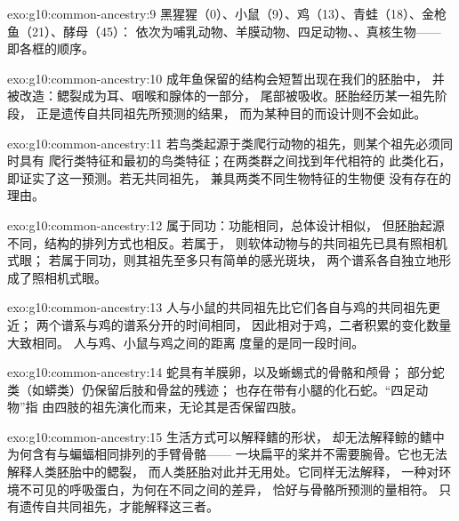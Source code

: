 \begin{solution}{exo:g10:common-ancestry:9}
黑猩猩（0）、小鼠（9）、鸡（13）、青蛙（18）、金枪鱼（21）、酵母（45）：
依次为哺乳动物、羊膜动物、四足动物、、真核生物——
即各框的顺序。
\end{solution}

\begin{solution}{exo:g10:common-ancestry:10}
成年鱼保留的结构会短暂出现在我们的胚胎中，
并被改造：鳃裂成为耳、咽喉和腺体的一部分，
尾部被吸收。胚胎经历某一祖先阶段，
正是遗传自共同祖先所预测的结果，
而为某种目的而设计则不会如此。
\end{solution}

\begin{solution}{exo:g10:common-ancestry:11}
若鸟类起源于类爬行动物的祖先，则某个祖先必须同时具有
爬行类特征和最初的鸟类特征；在两类群之间找到年代相符的
此类化石，即证实了这一预测。若无共同祖先，
兼具两类不同生物特征的生物便
没有存在的理由。
\end{solution}

\begin{solution}{exo:g10:common-ancestry:12}
属于同功：功能相同，总体设计相似，
但胚胎起源不同，结构的排列方式也相反。若属于，
则软体动物与的共同祖先已具有照相机式眼；
若属于同功，则其祖先至多只有简单的感光斑块，
两个谱系各自独立地形成了照相机式眼。
\end{solution}

\begin{solution}{exo:g10:common-ancestry:13}
人与小鼠的共同祖先比它们各自与鸡的共同祖先更近；
两个谱系与鸡的谱系分开的时间相同，
因此相对于鸡，二者积累的变化数量大致相同。
人与鸡、小鼠与鸡之间的距离
度量的是同一段时间。
\end{solution}

\begin{solution}{exo:g10:common-ancestry:14}
蛇具有羊膜卵，以及蜥蜴式的骨骼和颅骨；
部分蛇类（如蟒类）仍保留后肢和骨盆的残迹；
也存在带有小腿的化石蛇。“四足动物”指
由四肢的祖先演化而来，无论其是否保留四肢。
\end{solution}

\begin{solution}{exo:g10:common-ancestry:15}
生活方式可以解释鳍的形状，
却无法解释鲸的鳍中为何含有与蝙蝠相同排列的手臂骨骼——
一块扁平的桨并不需要腕骨。它也无法解释人类胚胎中的鳃裂，
而人类胚胎对此并无用处。它同样无法解释，
一种对环境不可见的呼吸蛋白，为何在不同之间的差异，
恰好与骨骼所预测的量相符。
只有遗传自共同祖先，才能解释这三者。
\end{solution}

